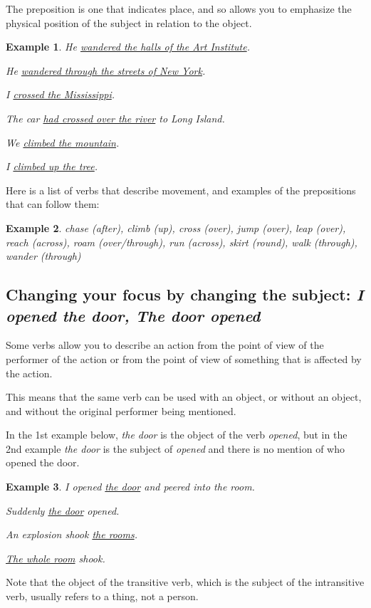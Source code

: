 \documentclass[oneside]{book}
\numberwithin{equation}{section}
\newtheorem{example}{Example}[section]
\begin{document}
The preposition is one that indicates place, and so allows you to emphasize the physical position of the subject in relation to the object.
\begin{example}
    He \underline{wandered the halls of the Art Institute}.
    
    He \underline{wandered through the streets of New York}.
    
    I \underline{crossed the Mississippi}.
    
    The car \underline{had crossed over the river} to Long Island.
    
    We \underline{climbed the mountain}.
    
    I \underline{climbed up the tree}.
\end{example}
Here is a list of verbs that describe movement, and examples of the prepositions that can follow them:
\begin{example}
    chase (after), climb (up), cross (over), jump (over), leap (over), reach (across), roam (over/through), run (across), skirt (round), walk (through), wander (through)
\end{example}

\subsection{Changing your focus by changing the subject: \textit{I opened the door, The door opened}}
\noindent{} Some verbs allow you to describe an action from the point of view of the performer of the action or from the point of view of something that is affected by the action.

This means that the same verb can be used with an object, or without an object, and without the original performer being mentioned.

%
In the 1st example below, \textit{the door} is the object of the verb \textit{opened}, but in the 2nd example \textit{the door} is the subject of \textit{opened} and there is no mention of who opened the door.
\begin{example}
    I opened \underline{the door} and peered into the room.
    
    Suddenly \underline{the door} opened.
    
    An explosion shook \underline{the rooms}.
    
    \underline{The whole room} shook.
\end{example}
Note that the object of the transitive verb, which is the subject of the intransitive verb, usually refers to a thing, not a person.
\end{document}
